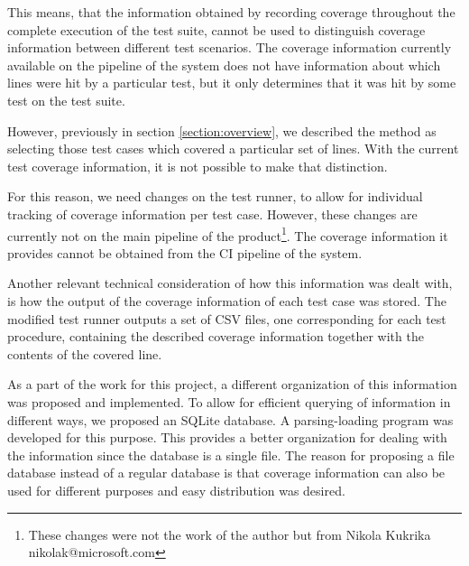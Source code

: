 \documentclass{article}
\begin{document}
This means, that the information obtained by recording coverage throughout the complete execution of the test suite, cannot be used to distinguish coverage information between different test scenarios. The coverage information currently available on the pipeline of the system does not have information about which lines were hit by a particular test, but it only determines that it was hit by some test on the test suite.

However, previously in section \ref{section:overview}, we described the method as selecting those test cases which covered a particular set of lines. With the current test coverage information, it is not possible to make that distinction.

For this reason, we need changes on the test runner, to allow for individual tracking of coverage information per test case. However, these changes are currently not on the main pipeline of the product\footnote{These changes were not the work of the author but from Nikola Kukrika nikolak@microsoft.com}. The coverage information it provides cannot be obtained from the CI pipeline of the system.

Another relevant technical consideration of how this information was dealt with, is how the output of the coverage information of each test case was stored. The modified test runner outputs a set of CSV files, one corresponding for each test procedure, containing the described coverage information together with the contents of the covered line.

As a part of the work for this project, a different organization of this information was proposed and implemented. To allow for efficient querying of information in different ways, we proposed an SQLite database. A parsing-loading program was developed for this purpose. This provides a better organization for dealing with the information since the database is a single file. The reason for proposing a file database instead of a regular database is that coverage information can also be used for different purposes and easy distribution was desired.
\end{document}
